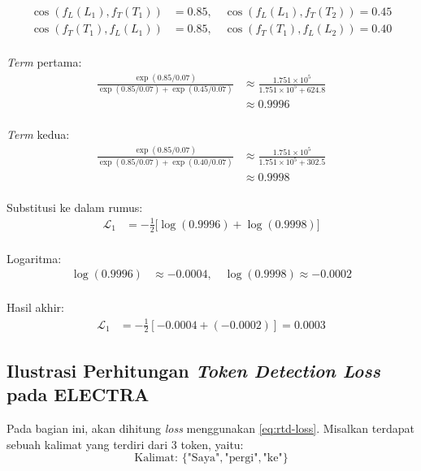 \begin{align*}
    \cos(f_L(L_1), f_T(T_1)) &= 0.85, \quad \cos(f_L(L_1), f_T(T_2)) = 0.45 \\
    \cos(f_T(T_1), f_L(L_1)) &= 0.85, \quad \cos(f_T(T_1), f_L(L_2)) = 0.40\\
\end{align*}

\textit{Term} pertama: \\
\begin{align*}
    \frac{\exp(0.85 / 0.07)}{\exp(0.85 / 0.07) + \exp(0.45 / 0.07)} 
    &\approx \frac{1.751 \times 10^5}{1.751 \times 10^5 + 624.8} \\
    &\approx 0.9996\\
\end{align*}

\textit{Term} kedua:\\
\begin{align*}
    \frac{\exp(0.85 / 0.07)}{\exp(0.85 / 0.07) + \exp(0.40 / 0.07)} 
    &\approx \frac{1.751 \times 10^5}{1.751 \times 10^5 + 302.5} \\
    &\approx 0.9998\\
\end{align*}

Substitusi ke dalam rumus:\\
\begin{align*}
    \mathcal{L}_1 &= - \frac{1}{2} \bigg[ \log(0.9996) + \log(0.9998)
    \bigg]\\
\end{align*}

Logaritma:\\
\begin{align*}
    \log(0.9996) &\approx -0.0004, \quad \log(0.9998) \approx -0.0002\\
\end{align*}

Hasil akhir:\\
\begin{align*}
    \mathcal{L}_1 &= - \frac{1}{2} \left[ -0.0004 + (-0.0002) \right] = 0.0003
\end{align*}

\subsection{Ilustrasi Perhitungan \textit{Token Detection Loss} pada ELECTRA} \label{subsec:ilustrasi_token_detection_loss_electra}

Pada bagian ini, akan dihitung \textit{loss} menggunakan \ref{eq:rtd-loss}. 
Misalkan terdapat sebuah kalimat yang terdiri dari 3 token, yaitu:
\\ 
\[
\text{Kalimat: } \{ \text{"Saya"}, \text{"pergi"}, \text{"ke"} \}
\]
\\

